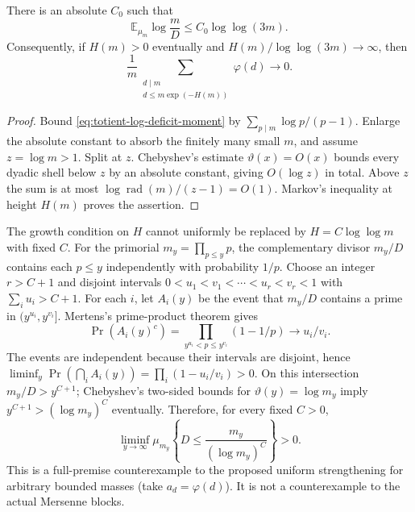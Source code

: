 \begin{theorem}
\label{thm:totient-moving-concentration}
There is an absolute $C_0$ such that
\[
 \mathbb E_{\mu_m}\log\frac mD
 \le C_0\log\log(3m).
\]
Consequently, if $H(m)>0$ eventually and
$H(m)/\log\log(3m)\to\infty$, then
\[
 \frac1m\sum_{\substack{d\mid m\\
        d\le m\exp(-H(m))}}\varphi(d)\longrightarrow0.
\]
\end{theorem}

\begin{proof}
Bound \eqref{eq:totient-log-deficit-moment} by
$\sum_{p\mid m}\log p/(p-1)$.  Enlarge the absolute constant to absorb the
finitely many small $m$, and assume $z=\log m>1$.  Split at $z$.
Chebyshev's estimate $\vartheta(x)=O(x)$ bounds every dyadic shell below
$z$ by an absolute constant, giving $O(\log z)$ in total.  Above $z$ the
sum is at most $\log\operatorname{rad}(m)/(z-1)=O(1)$.  Markov's inequality
at height $H(m)$ proves the assertion.
\end{proof}

The growth condition on $H$ cannot uniformly be replaced by
$H=C\log\log m$ with fixed $C$.  For the primorial
$m_y=\prod_{p\le y}p$, the complementary divisor $m_y/D$ contains each
$p\le y$ independently with probability $1/p$.  Choose an integer $r>C+1$
and disjoint intervals
$0<u_1<v_1<\cdots<u_r<v_r<1$ with $\sum_i u_i>C+1$.
For each $i$, let $A_i(y)$ be the event that $m_y/D$ contains a prime in
$(y^{u_i},y^{v_i}]$.  Mertens's prime-product theorem \cite{Mertens1874}
gives
\[
 \Pr(A_i(y)^c)=
 \prod_{y^{u_i}<p\le y^{v_i}}(1-1/p)\longrightarrow u_i/v_i.
\]
The events are independent because their intervals are disjoint, hence
$\liminf_y\Pr(\bigcap_iA_i(y))=\prod_i(1-u_i/v_i)>0$.
On this intersection $m_y/D>y^{C+1}$; Chebyshev's two-sided bounds for
$\vartheta(y)=\log m_y$ imply
$y^{C+1}>(\log m_y)^C$ eventually.  Therefore, for every fixed $C>0$,
\[
 \liminf_{y\to\infty}\mu_{m_y}
 \left\{D\le\frac{m_y}{(\log m_y)^C}\right\}>0.
\]
This is a full-premise counterexample to the proposed uniform strengthening
for arbitrary bounded masses (take $a_d=\varphi(d)$).  It is not a
counterexample to the actual Mersenne blocks.

